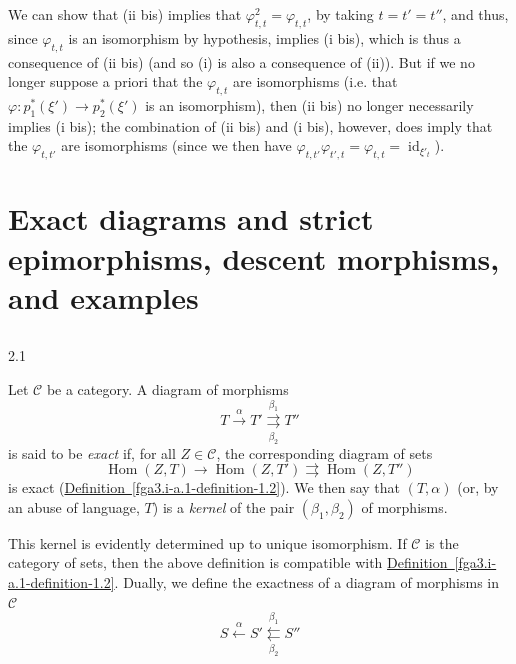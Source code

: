   We can show that (ii bis) implies that \(\varphi _{t,t}^2=\varphi _{t,t}\), by taking \(t=t'=t''\), and thus, since \(\varphi _{t,t}\) is an isomorphism by hypothesis, implies (i bis), which is thus a consequence of (ii bis) (and so (i) is also a consequence of (ii)).
  But if we no longer suppose a priori that the \(\varphi _{t,t}\) are isomorphisms (i.e. that \(\varphi \colon  p_1^*(\xi ')\to  p_2^*(\xi ')\) is an isomorphism), then (ii bis) no longer necessarily implies (i bis);
  the combination of (ii bis) and (i bis), however, does imply that the \(\varphi _{t,t'}\) are isomorphisms (since we then have \(\varphi _{t,t'}\varphi _{t',t}=\varphi _{t,t}=\operatorname {id}_{\xi '_t}\)).\section{Exact diagrams and strict epimorphisms, descent morphisms, and examples}\label{fga3.i-a.2}\subsection{}\label{fga3.i-a.2.a}\begin{definition}{2.1}\label{fga3.i-a.2-definition-2.1}\skipsinglepar\par{}Let \(\mathcal {C}\) be a category.
    A diagram of morphisms
    \[       T \xrightarrow {\alpha }       T' \overset {\beta _1}{\underset {\beta _2}{\rightrightarrows }}       T''     \]
    is said to be \emph{exact} if, for all \(Z\in \mathcal {C}\), the corresponding diagram of sets
    \[       \operatorname {Hom}(Z,T) \to        \operatorname {Hom}(Z,T') \rightrightarrows        \operatorname {Hom}(Z,T'')     \]
    is exact (\hyperref[fga3.i-a.1-definition-1.2]{Definition~\ref*{fga3.i-a.1-definition-1.2}}).
    We then say that \((T,\alpha )\) (or, by an abuse of language, \(T\)) is a \emph{kernel} of the pair \((\beta _1,\beta _2)\) of morphisms.\end{definition}\par{}This kernel is evidently determined up to unique isomorphism.
  If \(\mathcal {C}\) is the category of sets, then the above definition is compatible with \hyperref[fga3.i-a.1-definition-1.2]{Definition~\ref*{fga3.i-a.1-definition-1.2}}.
  Dually, we define the exactness of a diagram of morphisms in \(\mathcal {C}\)
  \[     S \xleftarrow {\alpha }     S' \overset {\beta _1}{\underset {\beta _2}{\leftleftarrows }}     S''   \]
